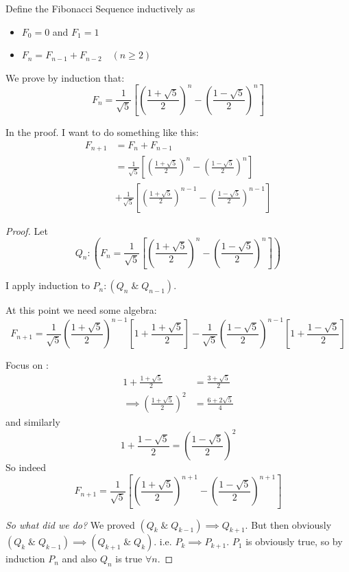 \documentclass[10pt]{scrartcl}
\begin{document}
\begin{example}
Define the Fibonacci Sequence inductively as 
\begin{itemize}
\item $F_0 = 0$ and $F_1 = 1$
\item $F_n = F_{n-1} + F_{n-2}\quad (n \geq 2)$	
\end{itemize}

We prove by induction that: 
\[F_n = \frac{1}{\sqrt{5}} \left[\left(\frac{1+\sqrt{5}}{2}\right)^n - \left(\frac{1-\sqrt{5}}{2}\right)^n\right]\]
	
In the proof. I want to do something like this: 
\[
\begin{aligned}
  F_{n+1} &= F_n + F_{n-1} \\ 
  &= \frac{1}{\sqrt{5}} \left[\left(\frac{1+\sqrt{5}}{2}\right)^n - \left(\frac{1-\sqrt{5}}{2}\right)^n\right]\\
  &+ \frac{1}{\sqrt{5}} \left[\left(\frac{1+\sqrt{5}}{2}\right)^{n-1} - \left(\frac{1-\sqrt{5}}{2}\right)^{n-1}\right]
\end{aligned}
\]

\vspace*{5pt}
\begin{proof}
Let 
\[Q_n: \left(F_n = \frac{1}{\sqrt{5}} \left[\left(\frac{1+\sqrt{5}}{2}\right)^n - \left(\frac{1-\sqrt{5}}{2}\right)^n\right]\right)\]	

I apply induction to $P_n: (Q_n \;\&\; Q_{n-1})$. 

At this point we need some algebra: 
\[F_{n+1} = \frac{1}{\sqrt{5}} \left(\frac{1+\sqrt{5}}{2}\right)^{n-1}\left[1+ \frac{1+\sqrt{5}}{2}\right] - \frac{1}{\sqrt{5}}\left(\frac{1-\sqrt{5}}{2}\right)^{n-1}\left[1 +\frac{1-\sqrt{5}}{2}\right]  \]


Focus on :
\[
\begin{aligned}
  1 + \frac{1+\sqrt{5}}{2} &= \frac{3 + \sqrt{5}}{2}\\
  \implies \left(\frac{1+ \sqrt{5}}{2}\right)^2 &= \frac{6 + 2\sqrt{5}}{4}
\end{aligned}
\]
and similarly 
\[1 + \frac{1-\sqrt{5}}{2} = \left(\frac{1-\sqrt{5}}{2}\right)^2\]
So indeed
\[F_{n+1} = \frac{1}{\sqrt{5}} \left[\left(\frac{1+\sqrt{5}}{2}\right)^{n+1} - \left(\frac{1-\sqrt{5}}{2}\right)^{n+1}\right]\]
\vspace*{5pt}

\emph{So what did we do?} We proved $(Q_k \; \& \; Q_{k-1})\implies Q_{k+1}$. But then obviously $(Q_k \; \& \; Q_{k-1})\implies (Q_{k+1} \;\&\; Q_k)$. i.e. $P_k \implies P_{k+1}$. $P_1$ is obviously true, so by induction $P_n$ and also $Q_n$ is true $\forall n$. 
\end{proof}
\end{example}
\end{document}
